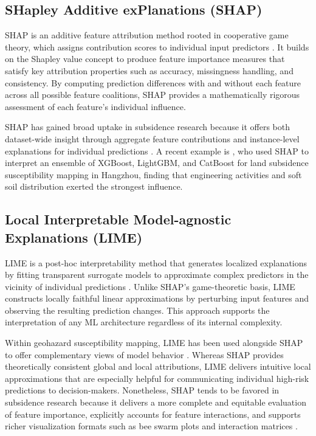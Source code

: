 \documentclass[oneside,doublespacing,flushright]{lsuthesis}
\begin{document}
\subsection{SHapley Additive exPlanations (SHAP)}
SHAP is an additive feature attribution method rooted in cooperative game theory, which assigns contribution scores to individual input predictors \citep{Lundberg2017}. It builds on the Shapley value concept to produce feature importance measures that satisfy key attribution properties such as accuracy, missingness handling, and consistency. By computing prediction differences with and without each feature across all possible feature coalitions, SHAP provides a mathematically rigorous assessment of each feature's individual influence.

SHAP has gained broad uptake in subsidence research because it offers both dataset-wide insight through aggregate feature contributions and instance-level explanations for individual predictions \citep{Gholami2023}. A recent example is \citet{yu_explainable_2025}, who used SHAP to interpret an ensemble of XGBoost, LightGBM, and CatBoost for land subsidence susceptibility mapping in Hangzhou, finding that engineering activities and soft soil distribution exerted the strongest influence.

\subsection{Local Interpretable Model-agnostic Explanations (LIME)}

LIME is a post-hoc interpretability method that generates localized explanations by fitting transparent surrogate models to approximate complex predictors in the vicinity of individual predictions \citep{Ribeiro2016}. 
Unlike SHAP's game-theoretic basis, LIME constructs locally faithful linear approximations by perturbing input features and observing the resulting prediction changes. This approach supports the interpretation of any ML architecture regardless of its internal complexity.

Within geohazard susceptibility mapping, LIME has been used alongside SHAP to offer complementary views of model behavior \citep{Vellido2020}. 
Whereas SHAP provides theoretically consistent global and local attributions, LIME delivers intuitive local approximations that are especially helpful for communicating individual high-risk predictions to decision-makers. 
Nonetheless, SHAP tends to be favored in subsidence research because it delivers a more complete and equitable evaluation of feature importance, explicitly accounts for feature interactions, and supports richer 
visualization formats such as bee swarm plots and interaction matrices \citep{Armaghani2025}.
\end{document}
